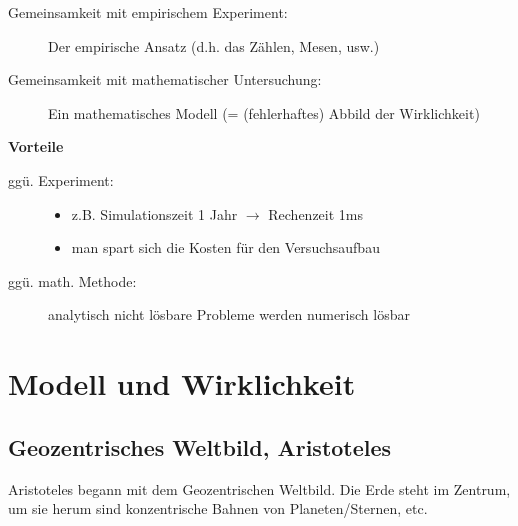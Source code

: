 \documentclass[11pt, a4paper]{article}
\begin{document}


\begin{figure}[H]
\centering
{}
\end{figure}


\begin{description}
\item[Gemeinsamkeit mit empirischem Experiment:]
        Der empirische Ansatz (d.h. das Zählen, Mesen, usw.)
  \item[Gemeinsamkeit mit mathematischer Untersuchung:]
        Ein mathematisches Modell (= (fehlerhaftes) Abbild der Wirklichkeit)
\end{description}

\noindent\textbf{Vorteile}
\begin{description}
  \item[ggü. Experiment:]
        \begin{itemize}
        \item z.B. Simulationszeit 1 Jahr $\rightarrow$ Rechenzeit 1ms
        \item man spart sich die Kosten für den Versuchsaufbau
        \end{itemize}
  \item[ggü. math. Methode:]
        analytisch nicht lösbare Probleme werden numerisch lösbar
\end{description}

\section{Modell und Wirklichkeit}
\subsection{Geozentrisches Weltbild, Aristoteles}
Aristoteles begann mit dem Geozentrischen Weltbild. Die Erde steht im Zentrum, um sie herum sind konzentrische Bahnen von Planeten/Sternen, etc.
\end{document}
